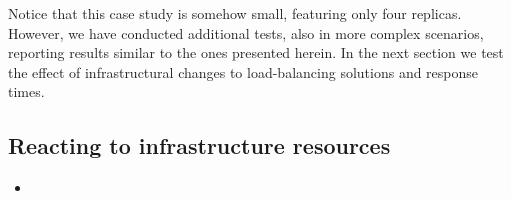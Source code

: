 Notice that this case study is somehow small, featuring only four replicas.
However, we have conducted additional tests, also in more complex scenarios, reporting results similar to the ones presented herein. In the next section we test the effect of infrastructural changes to load-balancing solutions and response times.

\subsection{Reacting to infrastructure resources}

\begin{itemize}
\item {}
\end{itemize}

